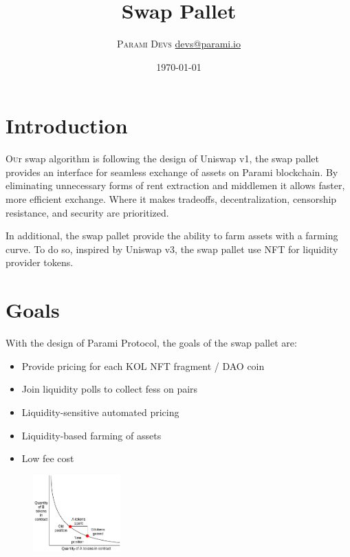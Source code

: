 \documentclass[twoside,twocolumn]{article}
\title{Swap Pallet} %
\author{%
\textsc{Parami Devs} %
\normalsize \href{mailto:devs@parami.io}{devs@parami.io} %
}
\date{\today} %
\begin{document}
\maketitle


\section{Introduction}

\lettrine[nindent=0em,lines=3]{O}ur swap algorithm is following the design of Uniswap v1\cite{ref2},
the swap pallet provides an interface for seamless exchange of assets on Parami blockchain.
By eliminating unnecessary forms of rent extraction and middlemen it allows faster,
more efficient exchange.
Where it makes tradeoffs, decentralization, censorship resistance,
and security are prioritized.

In additional, the swap pallet provide the ability to farm assets with a farming curve.
To do so, inspired by Uniswap v3, the swap pallet use NFT for liquidity provider tokens.


\section{Goals}

With the design of Parami Protocol, the goals of the swap pallet are:
\begin{itemize}
    \item Provide pricing for each KOL NFT fragment / DAO coin
    \item Join liquidity polls to collect fess on pairs
    \item Liquidity-sensitive automated pricing
    \item Liquidity-based farming of assets
    \item Low fee cost
\end{itemize}



\begin{figure}[h]
    \centering
    \includegraphics[width=0.3\textwidth]{xyk}
\end{figure}
\end{document}
